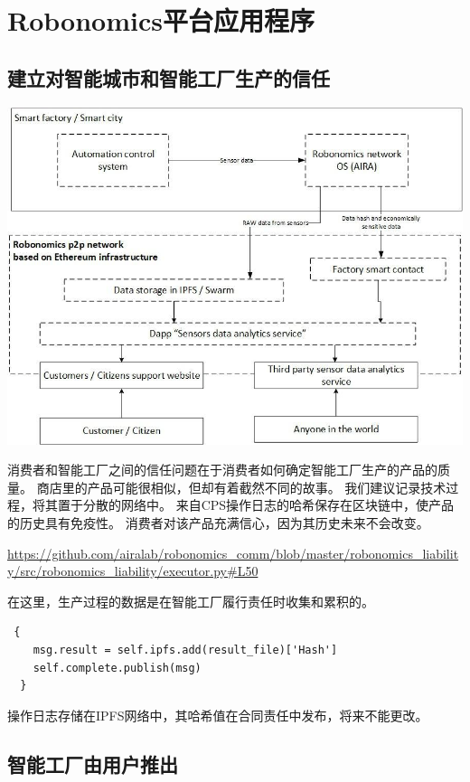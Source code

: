 \documentclass[UTF8]{article}
\begin{document}
\section{Robonomics平台应用程序}

\subsection{建立对智能城市和智能工厂生产的信任}

\includegraphics[width=1\textwidth]{app-1.png} 

消费者和智能工厂之间的信任问题在于消费者如何确定智能工厂生产的产品的质量。 商店里的产品可能很相似，但却有着截然不同的故事。 我们建议记录技术过程，将其置于分散的网络中。 来自CPS操作日志的哈希保存在区块链中，使产品的历史具有免疫性。 消费者对该产品充满信心，因为其历史未来不会改变。

\url{https://github.com/airalab/robonomics_comm/blob/master/robonomics_liability/src/robonomics_liability/executor.py#L50}

在这里，生产过程的数据是在智能工厂履行责任时收集和累积的。


\begin{lstlisting}
 {
	msg.result = self.ipfs.add(result_file)['Hash']
	self.complete.publish(msg)
  }
\end{lstlisting}


操作日志存储在IPFS网络中，其哈希值在合同责任中发布，将来不能更改。

\subsection{智能工厂由用户推出}
\end{document}
